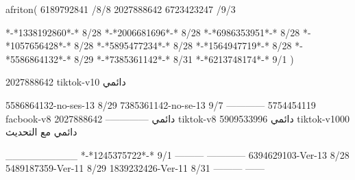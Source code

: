 afriton(
6189792841 /8/8
2027888642
6723423247 /9/3

*-*1338192860*-* 8/28
*-*2006681696*-* 8/28
*-*6986353951*-* 8/28
*-*1057656428*-* 8/28
*-*5895477234*-* 8/28
*-*1564947719*-* 8/28
*-*5586864132*-* 8/29
*-*7385361142*-* 8/31
*-*6213748174*-* 9/1
)

2027888642 tiktok-v10
دائمي

5586864132-no-ses-13
8/29
7385361142-no-se-13
9/7
------------
5754454119 facbook-v8
دائمي
--------------
2027888642 tiktok-v8
دائمي
5909533996 tiktok-v1000
دائمي مع التحديث

__________
*-*1245375722*-* 9/1
---------
------------
6394629103-Ver-13
8/28
5489187359-Ver-11
8/29
1839232426-Ver-11
8/31
---------
------
